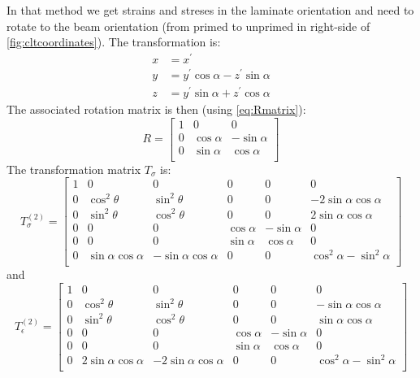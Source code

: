 \documentclass{article}
\begin{document}
In that method we get strains and streses in the laminate orientation and need to rotate to the beam orientation (from primed to unprimed in right-side of \cref{fig:cltcoordinates}).  The transformation is:
\begin{equation}
\begin{aligned}
    x &= x^\prime \\
    y &= y^\prime \cos\alpha - z^\prime \sin\alpha\\
    z &= y^\prime \sin\alpha + z^\prime \cos\alpha
\end{aligned}
\end{equation}
The associated rotation matrix is then (using \cref{eq:Rmatrix}):
\begin{equation}
    R =
    \begin{bmatrix}
        1 & 0 & 0 \\
        0 & \cos\alpha & -\sin\alpha \\
        0 & \sin\alpha & \cos\alpha \\
    \end{bmatrix}
    \end{equation}
The transformation matrix $T_\sigma$ is:
\begin{equation}
    T_\sigma^{(2)} =
\begin{bmatrix}
1 & 0 & 0 & 0 & 0 & 0 \\
0 & \cos^2\theta & \sin^2\theta & 0 &  0  & -2\sin\alpha\cos\alpha  \\
0 &  \sin^2\theta  &  \cos^2\theta  & 0  &  0   &   2\sin\alpha\cos\alpha   \\
0 & 0 & 0 & \cos\alpha & -\sin\alpha & 0 \\
0 & 0 & 0 & \sin\alpha & \cos\alpha & 0 \\
0 & \sin\alpha\cos\alpha & -\sin\alpha\cos\alpha  & 0 & 0 & \cos^2\alpha - \sin^2\alpha \\
\end{bmatrix}
\end{equation}
and
\begin{equation}
    T_\epsilon^{(2)} =
\begin{bmatrix}
1 & 0 & 0 & 0 & 0 & 0 \\
0 & \cos^2\theta & \sin^2\theta & 0 &  0  & -\sin\alpha\cos\alpha  \\
0 &  \sin^2\theta  &  \cos^2\theta  & 0  &  0   &   \sin\alpha\cos\alpha   \\
0 & 0 & 0 & \cos\alpha & -\sin\alpha & 0 \\
0 & 0 & 0 & \sin\alpha & \cos\alpha & 0 \\
0 & 2\sin\alpha\cos\alpha & -2\sin\alpha\cos\alpha  & 0 & 0 & \cos^2\alpha - \sin^2\alpha \\
\end{bmatrix}
\end{equation}
\end{document}

